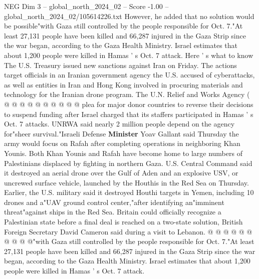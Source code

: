 \begin{textsample}{NEG Dim 3 – global\_north\_2024\_02 – Score -1.00 – global\_north\_2024\_02/105614226.txt}
However, he added that no solution would be possible"with Gaza still controlled by the people responsible for Oct. 7."At least 27,131 people have been killed and 66,287 injured in the Gaza Strip since the war began, according to the Gaza Health Ministry.
Israel estimates that about 1,200 people were killed in Hamas ' s Oct. 7 attack.
Here ' s what to know The U.S.
Treasury issued new sanctions against Iran on Friday.
The actions target officials in an Iranian government agency the U.S. accused of cyberattacks, as well as entities in Iran and Hong Kong involved in procuring materials and technology for the Iranian drone program.
The U.N.
Relief and Works Agency ( @ @ @ @ @ @ @ @ @ @ plea for major donor countries to reverse their decisions to suspend funding after Israel charged that its staffers participated in Hamas ' s Oct. 7 attacks.
UNRWA said nearly 2 million people depend on the agency for"sheer survival."Israeli Defense \textbf{Minister} Yoav Gallant said Thursday the army would focus on Rafah after completing operations in neighboring Khan Younis.
Both Khan Younis and Rafah have become home to large numbers of Palestinians displaced by fighting in northern Gaza.
U.S.
Central Command said it destroyed an aerial drone over the Gulf of Aden and an explosive USV, or uncrewed surface vehicle, launched by the Houthis in the Red Sea on Thursday.
Earlier, the U.S. military said it destroyed Houthi targets in Yemen, including 10 drones and a"UAV ground control center,"after identifying an"imminent threat"against ships in the Red Sea.
Britain could officially recognize a Palestinian state before a final deal is reached on a two-state solution, British Foreign Secretary David Cameron said during a visit to Lebanon. @ @ @ @ @ @ @ @ @ @"with Gaza still controlled by the people responsible for Oct. 7."At least 27,131 people have been killed and 66,287 injured in the Gaza Strip since the war began, according to the Gaza Health Ministry.
Israel estimates that about 1,200 people were killed in Hamas ' s Oct. 7 attack.

\end{textsample}
